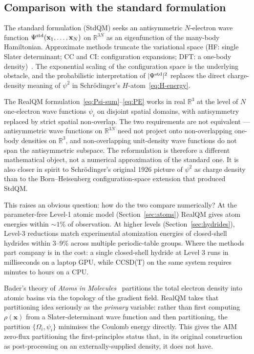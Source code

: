 \documentclass[11pt]{article}
\begin{document}
\subsection{Comparison with the standard formulation}

The standard formulation (StdQM) seeks an antisymmetric $N$-electron wave function $\Psi^{\rm std}(\mathbf{x}_1, \ldots, \mathbf{x}_N)$ on $\mathbb{R}^{3N}$ as an eigenfunction of the many-body Hamiltonian. Approximate methods truncate the variational space (HF: single Slater determinant; CC and CI: configuration expansions; DFT: a one-body density)~\cite{KS65,MHG17}. The exponential scaling of the configuration space is the underlying obstacle, and the probabilistic interpretation of $|\Psi^{\rm std}|^2$ replaces the direct charge-density meaning of $\psi^2$ in Schr\"odinger's $H$-atom~\eqref{eq:H-energy}.

The RealQM formulation~\eqref{eq:Psi-sum}--\eqref{eq:PE} works in real $\mathbb{R}^3$ at the level of $N$ one-electron wave functions $\psi_i$ on disjoint spatial domains, with antisymmetry replaced by strict spatial non-overlap. The two requirements are not equivalent --- antisymmetric wave functions on $\mathbb{R}^{3N}$ need not project onto non-overlapping one-body densities on $\mathbb{R}^3$, and non-overlapping unit-density wave functions do not span the antisymmetric subspace. The reformulation is therefore a different mathematical object, not a numerical approximation of the standard one. It is also closer in spirit to Schr\"odinger's original 1926 picture of $\psi^2$ as charge density than to the Born--Heisenberg configuration-space extension that produced StdQM.

This raises an obvious question: how do the two compare numerically? At the parameter-free Level-1 atomic model (Section~\ref{sec:atoms}) RealQM gives atom energies within ${\sim}1\%$ of observation. At higher levels (Section~\ref{sec:hydrides}), Level-3 reductions match experimental atomization energies of closed-shell hydrides within 3--9\% across multiple periodic-table groups. Where the methods part company is in the cost: a single closed-shell hydride at Level 3 runs in milliseconds on a laptop GPU, while CCSD(T) on the same system requires minutes to hours on a CPU.

Bader's theory of \emph{Atoms in Molecules}~\cite{Bader90} partitions the total electron density into atomic basins via the topology of the gradient field. RealQM takes that partitioning idea seriously as the \emph{primary} variable: rather than first computing $\rho(\mathbf{x})$ from a Slater-determinant wave function and then partitioning, the partition $\{\Omega_i, \psi_i\}$ minimises the Coulomb energy directly. This gives the AIM zero-flux partitioning the first-principles status that, in its original construction as post-processing on an externally-supplied density, it does not have.
\end{document}
